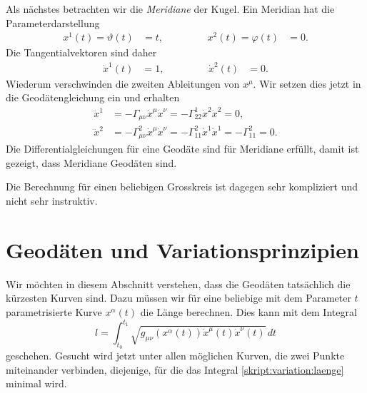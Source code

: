 Als nächstes betrachten wir die {\em Meridiane} der Kugel.
%
Ein Meridian hat die Parameterdarstellung
\[
\begin{aligned}
x^1(t)=\vartheta(t)&=t,
&\qquad&&
x^2(t)=\varphi(t)&=0.
\end{aligned}
\]
Die Tangentialvektoren sind daher
\[
\begin{aligned}
\dot x^1(t)&=1,
&\qquad&&
\dot x^2(t)&=0.
\end{aligned}
\]
Wiederum verschwinden
die zweiten Ableitungen von $x^\mu$.
Wir setzen dies jetzt in die Geodäten\-gleichung ein und erhalten
\begin{align*}
\ddot x^1
&=
-\Gamma_{\mu\nu}\dot x^\mu \dot x^\nu
=
-\Gamma_{22}^1\dot x^2 \dot x^2
=
0,
\\
\ddot x^2
&=
-\Gamma_{\mu\nu}^2\dot x^\mu \dot x^\nu
=
-\Gamma_{11}^2\dot x^1\dot x^1
=
-\Gamma_{11}^2
=
0.
\end{align*}
Die Differentialgleichungen für eine Geodäte sind für Meridiane erfüllt,
damit ist gezeigt, dass Meridiane Geodäten sind.

Die Berechnung für einen beliebigen Grosskreis ist dagegen sehr 
kompliziert und nicht sehr instruktiv.

\section{Geodäten und Variationsprinzipien%
\label{skript:geodaeten:section:variationsprinzip}}
Wir möchten in diesem Abschnitt verstehen, dass die Geodäten tatsächlich 
die kürzesten Kurven sind.
Dazu müssen wir für eine beliebige mit dem Parameter $t$ parametrisierte
Kurve $x^\alpha(t)$ die Länge berechnen.
Dies kann mit dem Integral
\begin{equation}
l=\int_{t_0}^{t_1} \sqrt{g_{\mu\nu}(x^\alpha(t)) \dot x^\mu(t)\dot x^\nu(t)}\,dt
\label{skript:variation:laenge}
\end{equation}
geschehen.
Gesucht wird jetzt unter allen möglichen Kurven, die zwei Punkte miteinander
verbinden, diejenige, für die das Integral \eqref{skript:variation:laenge}
minimal wird.

